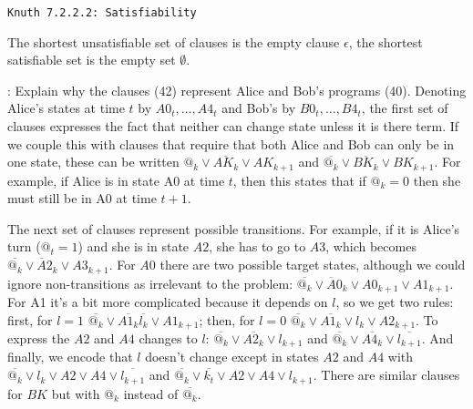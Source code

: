 \def\newstep#1{\smallskip \noindent {\bf #1}}
\def\newprob#1{\vskip 0.12in \noindent {\bf #1}}

\topglue 0.5in
\centerline{\tt Knuth 7.2.2.2: Satisfiability}
\vskip 0.3in

\newprob{Problem 1} The shortest unsatisfiable set of clauses is the
empty clause $\epsilon$, the shortest satisfiable set is the empty set $\emptyset$.

\newprob{Problem~87}: Explain why the clauses (42) represent Alice and Bob's
programs (40).\hfil\break
Denoting Alice's states at time $t$ by $A0_t, \ldots, A4_t$ and Bob's by $B0_t, \ldots, B4_t$,
the first set of clauses expresses the fact that neither can change state unless it is there term.
If we couple this with clauses that require that both Alice and Bob can only be in one
state, these can be written $@_k \vee \overline{AK_{k}} \vee AK_{k+1}$
and $\overline{@_k} \vee \overline{BK_{k}} \vee BK_{k+1}$.  For example, if Alice is in state
A0 at time $t$, then this states that if $@_k = 0$ then she must still be in A0 at
time $t+1$.

The next set of clauses represent possible transitions.  For example, if it is
Alice's turn ($@_t = 1$) and she is in state $A2$, she has to go to $A3$, which becomes
$\overline{@_k} \vee {\overline A2_k} \vee A3_{k+1}$.  For $A0$ there are two possible
target states, although we could ignore non-transitions as irrelevant to the problem:
$\overline{@_k} \vee {\overline A0_k} \vee A0_{k+1} \vee A1_{k+1}$.  For A1 it's a bit more
complicated because it depends on $l$, so we get two rules: first, for $l=1$
$\overline{@_k} \vee \overline{A1_{k}} \overline{l_k} \vee A1_{k+1}$; then, for $l=0$
$\overline{@_k} \vee \overline{A1_{k}} \vee l_k \vee A2_{k+1}$.  To express the $A2$ and $A4$
changes to $l$: $\overline{@_k} \vee \overline{A2_k} \vee l_{k+1}$ and
$\overline{@_k} \vee \overline{A4_k} \vee \overline{l_{k+1}}$.  And finally, we encode
that $l$ doesn't change except in states $A2$ and $A4$ with
$\overline{@_k} \vee l_k \vee A2 \vee A4 \vee \overline{l_{k+1}}$
and $\overline{@_k} \vee \overline{k_t} \vee A2 \vee A4 \vee l_{k+1}$.
There are similar clauses for $BK$ but with $@_k$ instead of $\overline{@_k}$.

